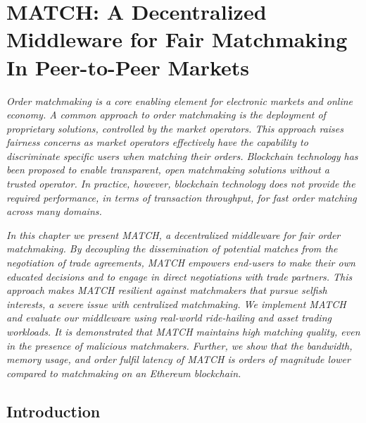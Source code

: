 \chapter{MATCH: A Decentralized Middleware for Fair Matchmaking In Peer-to-Peer Markets}
\label{chapter:match}

\emph{
	Order matchmaking is a core enabling element for electronic markets and online economy.
	A common approach to order matchmaking is the deployment of proprietary solutions, controlled by the market operators.
	This approach raises fairness concerns as market operators effectively have the capability to discriminate specific users when matching their orders.
	Blockchain technology has been proposed to enable transparent, open matchmaking solutions without a trusted operator.
	In practice, however, blockchain technology does not provide the required performance, in terms of transaction throughput, for fast order matching across many domains. }
	
\emph{
	In this chapter we present MATCH, a decentralized middleware for fair order matchmaking.
	By decoupling the dissemination of potential matches from the negotiation of trade agreements, MATCH empowers end-users to make their own educated decisions and to engage in direct negotiations with trade partners.
	This approach makes MATCH resilient against matchmakers that pursue selfish interests, a severe issue with centralized matchmaking.
	We implement MATCH and evaluate our middleware using real-world ride-hailing and asset trading workloads.
	It is demonstrated that MATCH maintains high matching quality, even in the presence of malicious matchmakers.
	Further, we show that the bandwidth, memory usage, and order fulfil latency of MATCH is orders of magnitude lower compared to matchmaking on an Ethereum blockchain. }

\newpage

\section{Introduction}
\label{sec:introduction}

